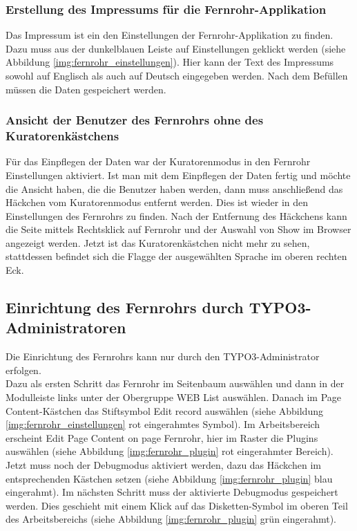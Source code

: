 \subsubsection{Erstellung des Impressums für die Fernrohr-Applikation}

Das Impressum ist ein den Einstellungen der Fernrohr-Applikation zu finden. Dazu muss aus der dunkelblauen Leiste auf \glqq Einstellungen\grqq{} geklickt werden (siehe Abbildung \ref{img:fernrohr_einstellungen}). Hier kann der Text des Impressums sowohl auf Englisch als auch auf Deutsch eingegeben werden. Nach dem Befüllen müssen die Daten gespeichert werden.


\subsubsection{Ansicht der Benutzer des Fernrohrs ohne des Kuratorenkästchens}

Für das Einpflegen der Daten war der Kuratorenmodus in den Fernrohr Einstellungen aktiviert. Ist man mit dem Einpflegen der Daten fertig und möchte die Ansicht haben, die die Benutzer haben werden, dann muss anschließend das Häckchen vom Kuratorenmodus entfernt werden.
Dies ist wieder in den Einstellungen des Fernrohrs zu finden. Nach der Entfernung des Häckchens kann die Seite mittels Rechtsklick auf \glqq Fernrohr\grqq{} und der Auswahl von \glqq Show\grqq{} im Browser angezeigt werden. Jetzt ist das Kuratorenkästchen nicht mehr zu sehen, stattdessen befindet sich die Flagge der ausgewählten Sprache im oberen rechten Eck.


\subsection{Einrichtung des Fernrohrs durch TYPO3-Administratoren}

Die Einrichtung des Fernrohrs kann nur durch den TYPO3-Administrator erfolgen.\\
Dazu als ersten Schritt das Fernrohr im Seitenbaum auswählen und dann in der Modulleiste links unter der Obergruppe WEB \glqq List\grqq{} auswählen. Danach im Page Content-Kästchen das Stiftsymbol \glqq Edit record\grqq{} auswählen (siehe Abbildung \ref{img:fernrohr_einstellungen} rot eingerahmtes Symbol). Im Arbeitsbereich erscheint \glqq Edit Page Content on page \glqq Fernrohr\grqq{}\grqq{}, hier im Raster die \glqq Plugins\grqq{} auswählen (siehe Abbildung \ref{img:fernrohr_plugin} rot eingerahmter Bereich). Jetzt muss noch der Debugmodus aktiviert werden, dazu das Häckchen im entsprechenden Kästchen setzen (siehe Abbildung \ref{img:fernrohr_plugin} blau eingerahmt). Im nächsten Schritt muss der aktivierte Debugmodus gespeichert werden. Dies geschieht mit einem Klick auf das Disketten-Symbol im oberen Teil des Arbeitsbereichs (siehe Abbildung \ref{img:fernrohr_plugin} grün eingerahmt).\\


